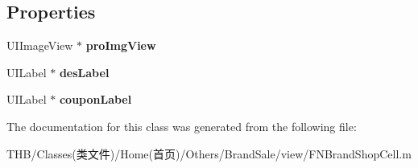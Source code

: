 \subsection*{Properties}
\begin{DoxyCompactItemize}
\item 
\mbox{\label{interface_f_n_brand_shop_pro_cell_a26da4000663d5042391c46f8482d7515}} 
U\+I\+Image\+View $\ast$ {\bfseries pro\+Img\+View}
\item 
\mbox{\label{interface_f_n_brand_shop_pro_cell_a4b9fff32a5c9f42ce976c28589d53b83}} 
U\+I\+Label $\ast$ {\bfseries des\+Label}
\item 
\mbox{\label{interface_f_n_brand_shop_pro_cell_a6e4b429e5693da2c3d71fae59d9eaa40}} 
U\+I\+Label $\ast$ {\bfseries coupon\+Label}
\end{DoxyCompactItemize}


The documentation for this class was generated from the following file\+:\begin{DoxyCompactItemize}
\item 
T\+H\+B/\+Classes(类文件)/\+Home(首页)/\+Others/\+Brand\+Sale/view/F\+N\+Brand\+Shop\+Cell.\+m\end{DoxyCompactItemize}
